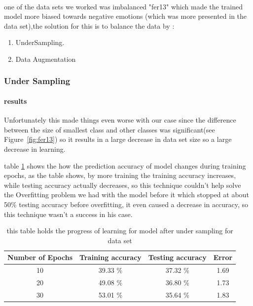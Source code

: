\paragraph{}
one of the data sets we worked was imbalanced "fer13" which made the trained model more biased towards negative emotions (which was more presented in the data set),the solution for this is to balance the data by :
\begin{enumerate}
	\item UnderSampling.
	\item Data Augmentation
\end{enumerate}
\subsubsection{Under Sampling}
\paragraph{results}
Unfortunately this made things even worse with our case since the difference between the size of smallest class and other classes was significant(see Figure~\ref{fig:fer13}) so it results in a large decrease in data set size so a large decrease in learning. \newline

table \ref{tab:table1} shows the how the prediction accuracy of model changes during training epochs, as the table shows, by more training the training accuracy increases, while testing accuracy actually decreases, so this technique couldn't help solve the Overfitting problem we had with the model before it which stopped at about 50\% testing accuracy before overfitting, it even caused a decrease in accuracy, so this technique wasn't a success in his case. 
\begin{table}[h!]
	\centering
	\caption{this table holds the progress of learning for model after under sampling for data set}
	\label{tab:table1}
	\begin{tabular}{c | c | c | c}
		\textbf{Number of Epochs} & \textbf{Training accuracy} & \textbf{Testing accuracy} & \textbf{Error}\\ \hline 
		10 & 39.33 \% & 37.32 \% & 1.69 \\
		20 & 49.08 \% & 36.80 \% & 1.73 \\
		30 & 53.01 \% & 35.64 \% & 1.83 \\
	\end{tabular}
\end{table}

